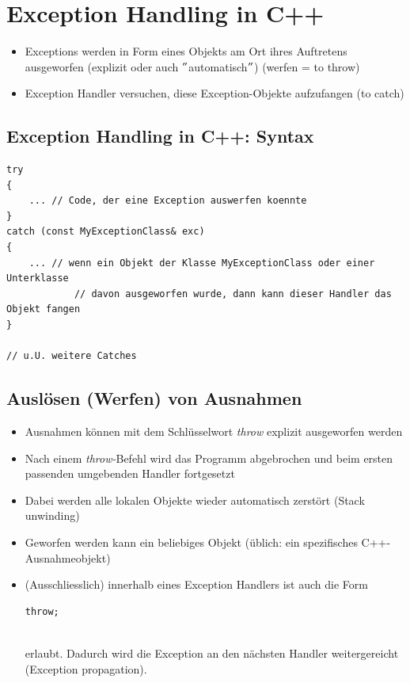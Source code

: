 \section{Exception Handling in C++}
\begin{itemize}
	\item Exceptions werden in Form eines Objekts am Ort ihres Auftretens ausgeworfen (explizit oder auch $"$automatisch$"$) (werfen = to throw)
	\item Exception Handler versuchen, diese Exception-Objekte aufzufangen (to catch)
\end{itemize}

\subsection{Exception Handling in C++: Syntax}
\begin{minipage}{\linewidth}
\vspace{-\baselineskip}
\begin{lstlisting}
try
{
	... // Code, der eine Exception auswerfen koennte
}
catch (const MyExceptionClass& exc)
{
	... // wenn ein Objekt der Klasse MyExceptionClass oder einer Unterklasse
			// davon ausgeworfen wurde, dann kann dieser Handler das Objekt fangen
}

// u.U. weitere Catches
\end{lstlisting}
\end{minipage}
\vfill
\pagebreak\newpage

\subsection{Auslösen (Werfen) von Ausnahmen}
\begin{itemize}
	\item Ausnahmen können mit dem Schlüsselwort \emph{throw} explizit ausgeworfen werden
	\item Nach einem \emph{throw-}Befehl wird das Programm abgebrochen und beim ersten passenden umgebenden Handler fortgesetzt
	\item Dabei werden alle lokalen Objekte wieder automatisch zerstört (Stack unwinding)
	\item Geworfen werden kann ein beliebiges Objekt (üblich: ein spezifisches C++-Ausnahmeobjekt)
	\item (Ausschliesslich) innerhalb eines Exception Handlers ist auch die Form\hspace{0.05\linewidth}
	\begin{minipage}{0.1\linewidth}
	\vspace{-\baselineskip}
\begin{lstlisting}
throw;
\end{lstlisting}
	\end{minipage}\\
	erlaubt. Dadurch wird die Exception an den nächsten Handler weitergereicht (Exception propagation).
\end{itemize}

